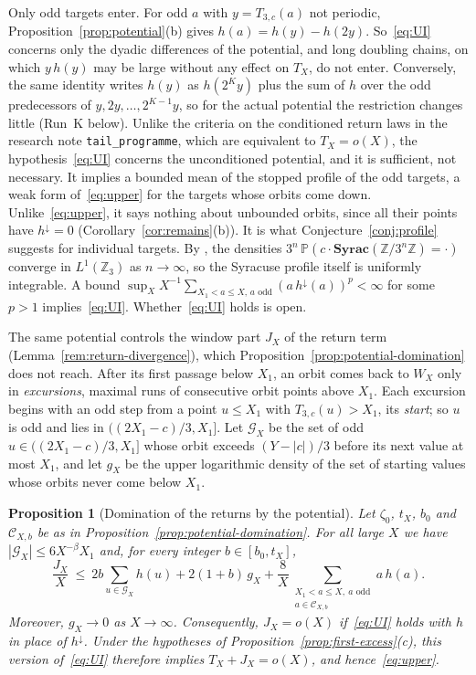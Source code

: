 \documentclass[12pt]{amsart}
\newtheorem{proposition}{Proposition}
\theoremstyle{definition}
\theoremstyle{remark}
\begin{document}
Only odd targets enter. For odd $a$ with $y=T_{3,c}(a)$ not periodic, Proposition~\ref{prop:potential}(b) gives $h(a)=h(y)-h(2y)$. So~\eqref{eq:UI} concerns only the dyadic differences of the potential, and long doubling chains, on which $y\,h(y)$ may be large without any effect on $T_X$, do not enter. Conversely, the same identity writes $h(y)$ as $h(2^Ky)$ plus the sum of $h$ over the odd predecessors of $y,2y,\dots,2^{K-1}y$, so for the actual potential the restriction changes little (Run~K below). Unlike the criteria on the conditioned return laws in the research note \texttt{tail\_programme}, which are equivalent to $T_X=o(X)$, the hypothesis~\eqref{eq:UI} concerns the unconditioned potential, and it is sufficient, not necessary. It implies a bounded mean of the stopped profile of the odd targets, a weak form of~\eqref{eq:upper} for the targets whose orbits come down. Unlike~\eqref{eq:upper}, it says nothing about unbounded orbits, since all their points have $h^\downarrow=0$ (Corollary~\ref{cor:remains}(b)). It is what Conjecture~\ref{conj:profile} suggests for individual targets. By \cite[(1.26)]{Tao_2022}, the densities $3^n\,\mathbb P(c\cdot\mathbf{Syrac}(\mathbb Z/3^n\mathbb Z)=\cdot)$ converge in $L^1(\mathbb Z_3)$ as $n\to\infty$, so the Syracuse profile itself is uniformly integrable. A bound $\sup_X X^{-1}\sum_{X_1<a\le X,\,a\text{ odd}}(a\,h^\downarrow(a))^p<\infty$ for some $p>1$ implies~\eqref{eq:UI}. Whether~\eqref{eq:UI} holds is open.

The same potential controls the window part $J_X$ of the return term (Lemma~\ref{rem:return-divergence}), which Proposition~\ref{prop:potential-domination} does not reach. After its first passage below $X_1$, an orbit comes back to $W_X$ only in \emph{excursions}, maximal runs of consecutive orbit points above $X_1$. Each excursion begins with an odd step from a point $u\le X_1$ with $T_{3,c}(u)>X_1$, its \emph{start}; so $u$ is odd and lies in $((2X_1-c)/3,X_1]$. Let $\mathcal G_X$ be the set of odd $u\in((2X_1-c)/3,X_1]$ whose orbit exceeds $(Y-|c|)/3$ before its next value at most $X_1$, and let $g_X$ be the upper logarithmic density of the set of starting values whose orbits never come below $X_1$.

\begin{proposition}[Domination of the returns by the potential]
\label{prop:return-domination}
Let $\zeta_0$, $t_X$, $b_0$ and $\mathcal C_{X,b}$ be as in Proposition~\ref{prop:potential-domination}. For all large $X$ we have $|\mathcal G_X|\le6X^{-\beta}X_1$ and, for every integer $b\in[b_0,t_X]$,
\[
 \frac{J_X}X\ \le\ 2b\sum_{u\in\mathcal G_X}h(u)+2(1+b)\,g_X+\frac8X\sum_{\substack{X_1<a\le X,\ a\text{ odd}\\ a\in\mathcal C_{X,b}}}a\,h(a).
\]
Moreover, $g_X\to0$ as $X\to\infty$. Consequently, $J_X=o(X)$ if~\eqref{eq:UI} holds with $h$ in place of $h^\downarrow$. Under the hypotheses of Proposition~\ref{prop:first-excess}(c), this version of~\eqref{eq:UI} therefore implies $T_X+J_X=o(X)$, and hence~\eqref{eq:upper}.
\end{proposition}
\end{document}
